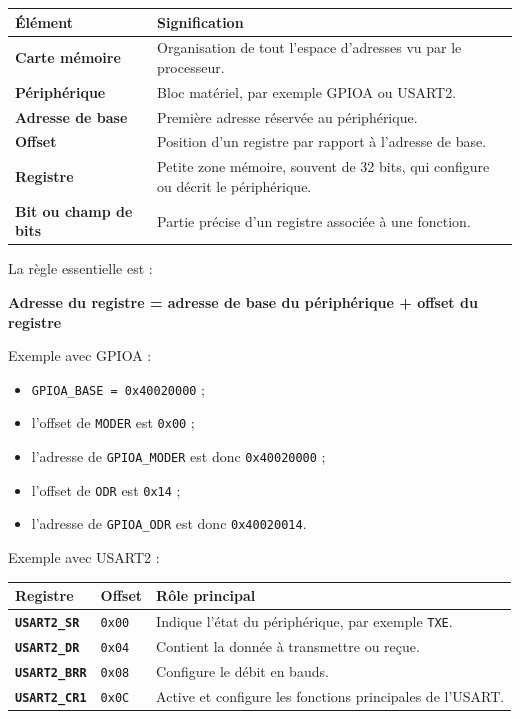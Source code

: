 \documentclass[11pt,a4paper]{article}
\begin{document}
	\begin{center}
		\begin{tabular}{>{\bfseries}p{4cm}p{9cm}}
			\toprule
			Élément & Signification \\
			\midrule
			Carte mémoire & Organisation de tout l'espace d'adresses vu par le processeur. \\
			Périphérique & Bloc matériel, par exemple GPIOA ou USART2. \\
			Adresse de base & Première adresse réservée au périphérique. \\
			Offset & Position d'un registre par rapport à l'adresse de base. \\
			Registre & Petite zone mémoire, souvent de 32 bits, qui configure ou décrit le périphérique. \\
			Bit ou champ de bits & Partie précise d'un registre associée à une fonction. \\
			\bottomrule
		\end{tabular}
	\end{center}
	
	La règle essentielle est :
	
	\begin{center}
		\textbf{Adresse du registre = adresse de base du périphérique + offset du registre}
	\end{center}
	
	Exemple avec GPIOA :
	
	\begin{itemize}
		\item \texttt{GPIOA\_BASE = 0x40020000} ;
		\item l'offset de \texttt{MODER} est \texttt{0x00} ;
		\item l'adresse de \texttt{GPIOA\_MODER} est donc \texttt{0x40020000} ;
		\item l'offset de \texttt{ODR} est \texttt{0x14} ;
		\item l'adresse de \texttt{GPIOA\_ODR} est donc \texttt{0x40020014}.
	\end{itemize}
	
	Exemple avec USART2 :
	
	\begin{center}
		\begin{tabular}{>{\bfseries}p{3.5cm}p{3cm}p{5cm}}
			\toprule
			Registre & Offset & Rôle principal \\
			\midrule
			\texttt{USART2\_SR} & \texttt{0x00} & Indique l'état du périphérique, par exemple \texttt{TXE}. \\
			\texttt{USART2\_DR} & \texttt{0x04} & Contient la donnée à transmettre ou reçue. \\
			\texttt{USART2\_BRR} & \texttt{0x08} & Configure le débit en bauds. \\
			\texttt{USART2\_CR1} & \texttt{0x0C} & Active et configure les fonctions principales de l'USART. \\
			\bottomrule
		\end{tabular}
	\end{center}
	
\end{document}

